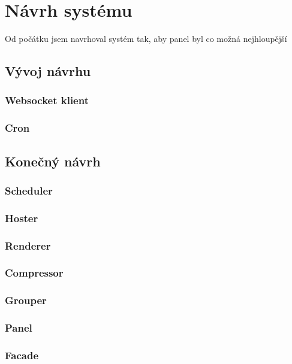 \chapter{Návrh systému}

Od počátku jsem navrhoval systém tak, aby panel byl co možná nejhloupější 

\section{Vývoj návrhu}
\subsection{Websocket klient}
\subsection{Cron}

\section{Konečný návrh}
    \subsection{Scheduler}
    \subsection{Hoster}
    \subsection{Renderer}
    \subsection{Compressor}
    \subsection{Grouper}
    \subsection{Panel}
    \subsection{Facade}